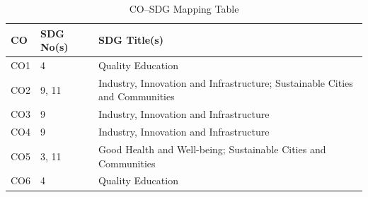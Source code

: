\documentclass[12pt,a4paper]{report}
\begin{document}
\begin{table}[h!]
    \centering
    \caption{CO–SDG Mapping Table}
    \renewcommand{\arraystretch}{1.3}
    \begin{tabular}{l l p{7cm}}
        \toprule
        \textbf{CO} & \textbf{SDG No(s)} & \textbf{SDG Title(s)} \\
        \midrule
        CO1 & 4 & Quality Education \\
        CO2 & 9, 11 & Industry, Innovation and Infrastructure; Sustainable Cities and Communities \\
        CO3 & 9 & Industry, Innovation and Infrastructure \\
        CO4 & 9 & Industry, Innovation and Infrastructure \\
        CO5 & 3, 11 & Good Health and Well-being; Sustainable Cities and Communities\\ 
        CO6 & 4 & Quality Education \\
        \bottomrule
    \end{tabular}
\end{table}
\end{document}

